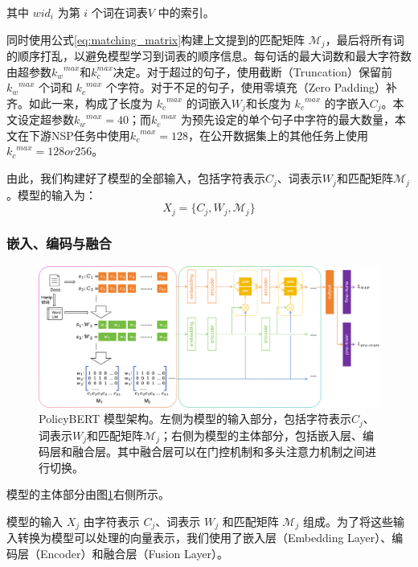 \documentclass[12pt, a4paper]{ctexart}
\begin{document}
其中 $wid_i$ 为第 $i$ 个词在词表$V$ 中的索引。

同时使用公式\ref{eq:matching_matrix}构建上文提到的匹配矩阵 ${\mathcal{M}}_j$，最后将所有词的顺序打乱，以避免模型学习到词表的顺序信息。每句话的最大词数和最大字符数由超参数${k_w}^{max}$和${k_c^{max}}$决定。对于超过的句子，使用截断（Truncation）保留前 ${k_w}^{max}$ 个词和 ${k_c}^{max}$ 个字符。对于不足的句子，使用零填充（Zero Padding）补齐。如此一来，构成了长度为 ${k_c}^{max}$ 的词嵌入$W_j$和长度为 ${k_c}^{max}$ 的字嵌入$C_j$。本文设定超参数${k_w}^{max}=40$；而${k_c}^{max}$ 为预先设定的单个句子中字符的最大数量，本文在下游NSP任务中使用${k_c}^{max}=128$，在公开数据集上的其他任务上使用${k_c}^{max}=128 or 256$。

由此，我们构建好了模型的全部输入，包括字符表示$C_j$、词表示$W_j$和匹配矩阵${\mathcal{M}}_j$。模型的输入为：
\begin{equation}
        X_j = \{C_j, W_j, {\mathcal{M}}_j\}
\end{equation}

\subsubsection{嵌入、编码与融合}

\begin{figure}
    \centering
    \includegraphics[width=1\textwidth]{./images/model_structure.png}
    \caption{PolicyBERT 模型架构。左侧为模型的输入部分，包括字符表示$C_j$、词表示$W_j$和匹配矩阵${\mathcal{M}}_j$；右侧为模型的主体部分，包括嵌入层、编码层和融合层。其中融合层可以在门控机制和多头注意力机制之间进行切换。}
    \label{fig:policybert}
\end{figure}

模型的主体部分由图\ref{fig:policybert}右侧所示。

模型的输入 $X_j$ 由字符表示 $C_j$、词表示 $W_j$ 和匹配矩阵 ${\mathcal{M}}_j$ 组成。为了将这些输入转换为模型可以处理的向量表示，我们使用了嵌入层（Embedding Layer）、编码层（Encoder）和融合层（Fusion Layer）。
\end{document}
